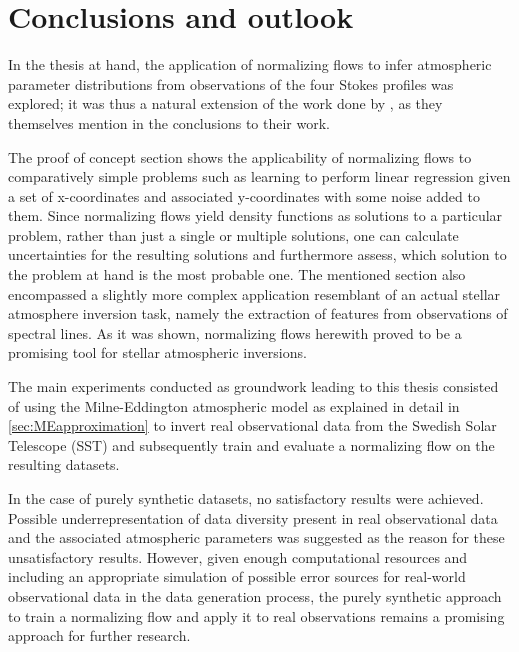 \documentclass[a4paper,12pt]{report}
\def\lk#1{{\color{black}{#1}}}
\begin{document}
\FloatBarrier
\chapter{Conclusions and outlook}
\lk{In this last chapter, the main conclusions from the beforehand discussed material shall be recalled and summarized.}

In the thesis at hand, the application of normalizing flows to infer atmospheric parameter distributions from observations of the four Stokes profiles was explored; it was thus a natural extension of the work done by \cite{DiazBaso.2022}, as they themselves mention in the conclusions to their work.

The proof of concept section shows the applicability of normalizing flows to comparatively simple problems such as learning to perform linear regression given a set of x-coordinates and associated y-coordinates with some noise added to them. Since normalizing flows yield density functions as solutions to a particular problem, rather than just a single or multiple solutions, one can calculate uncertainties for the resulting solutions and furthermore assess, which solution to the problem at hand is the most probable one. The mentioned section also encompassed a slightly more complex application resemblant of an actual stellar atmosphere inversion task, namely the extraction of features from observations of spectral lines. As it was shown, normalizing flows herewith proved to be a promising tool for stellar atmospheric inversions.

The main experiments conducted as groundwork leading to this thesis consisted of using the Milne-Eddington atmospheric model as explained in detail in \cref{sec:MEapproximation} to invert real observational data from the Swedish Solar Telescope (SST) and subsequently train and evaluate a normalizing flow on the resulting datasets.

In the case of purely synthetic datasets, no satisfactory results were achieved. Possible underrepresentation of data diversity present in real observational data and the associated atmospheric parameters was suggested as the reason for these unsatisfactory results. However, given enough computational resources and including an appropriate simulation of possible error sources for real-world observational data in the data generation process, the purely synthetic approach to train a normalizing flow and apply it to real observations remains a promising approach for further research.
\end{document}

